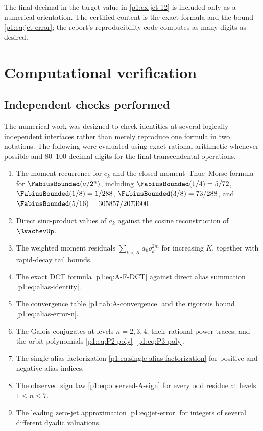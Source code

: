 \documentclass[11pt,oneside]{article}
\theoremstyle{definition}
\theoremstyle{remark}
\begin{document}
\begin{warning}
The final decimal in the target value in \cref{p1:ex:jet-12} is included only as a
numerical orientation.  The certified content is the exact formula and the
bound \eqref{p1:eq:jet-error}; the report's reproducibility code computes as many
digits as desired.
\end{warning}

\section{Computational verification}\label{p1:sec:verification}

\subsection{Independent checks performed}

The numerical work was designed to check identities at several logically
independent interfaces rather than merely reproduce one formula in two notations.
The following were evaluated using exact rational arithmetic whenever possible
and 80--100 decimal digits for the final transcendental operations.
\begin{enumerate}
 \item The moment recurrence for $c_k$ and the closed moment--Thue--Morse formula
 for $\FabiusBounded(a/2^n)$, including
 $\FabiusBounded(1/4)=5/72$, $\FabiusBounded(1/8)=1/288$,
 $\FabiusBounded(3/8)=73/288$, and
 $\FabiusBounded(5/16)=305857/2073600$.
 \item Direct sinc-product values of $a_k$ against the cosine reconstruction of
 $\RvachevUp$.
 \item The weighted moment residuals
 $\sum_{k<K}a_ko_k^{2m}$ for increasing $K$, together with rapid-decay tail
 bounds.
 \item The exact DCT formula \eqref{p1:eq:A-F-DCT} against direct alias summation
 \eqref{p1:eq:alias-identity}.
 \item The convergence table \cref{p1:tab:A-convergence} and the rigorous bound
 \eqref{p1:eq:alias-error-n}.
 \item The Galois conjugates at levels $n=2,3,4$, their rational power traces,
 and the orbit polynomials \eqref{p1:eq:P2-poly}--\eqref{p1:eq:P3-poly}.
 \item The single-alias factorization \eqref{p1:eq:single-alias-factorization} for
 positive and negative alias indices.
 \item The observed sign law \eqref{p1:eq:observed-A-sign} for every odd residue at
 levels $1\le n\le7$.
 \item The leading zero-jet approximation \eqref{p1:eq:jet-error} for integers of
 several different dyadic valuations.
\end{enumerate}
\end{document}
